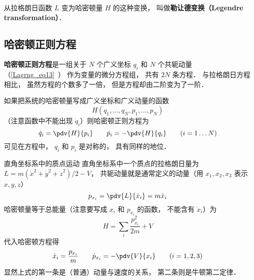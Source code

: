 从拉格朗日函数 $L$ 变为哈密顿量 $H$ 的这种变换， 叫做\textbf{勒让德变换（Legendre transformation）}．

\subsection{哈密顿正则方程}
\textbf{哈密顿正则方程}是一组关于 $N$ 个广义坐标 $q_i$ 和 $N$ 个共轭动量（\autoref{Lagrng_eq13}~） 作为变量的微分方程组， 共有 $2N$ 条方程． 与拉格朗日方程相比， 虽然方程的个数多了一倍， 但是方程却由二阶变为了一阶．

如果把系统的哈密顿量写成广义坐标和广义动量的函数
\begin{equation}
H(q_1,\dots, q_N, p_1,\dots, p_N)
\end{equation}
（注意函数中不能出现 $\dot q_i$）则哈密顿正则方程为
\begin{equation}\label{HamCan_eq2}
\dot q_i = \pdv{H}{p_i}
\qquad
\dot p_i = -\pdv{H}{q_i}
\qquad
(i = 1\dots N)
\end{equation}
可见在方程中， $q_i$ 和 $p_i$ 是对称的， 具有同样的地位．

\begin{example}{直角坐标系中的质点运动}
直角坐标系中一个质点的拉格朗日量为 $L = m(\dot x^2 + \dot y^2 + \dot z^2)/2 - V$， 共轭动量就是通常定义的动量（用 $x_1,x_2,x_3$ 表示 $x, y, z$）
\begin{equation}
p_{x_i} = \pdv{L}{\dot x_i} = m\dot x_i
\end{equation}
哈密顿量等于总能量（注意要写成 $x_i$ 和 $p_{x_i}$ 的函数， 不能含有 $\dot x_i$）为
\begin{equation}
H = \sum_i \frac{p_{x_i}^2}{2m} + V
\end{equation}
代入哈密顿方程得
\begin{equation}
\dot x_i = \frac{p_{x_i}}{m}
\qquad
\dot p_{x_i} = -\pdv{V}{x_i}
\qquad (i = 1,2,3)
\end{equation}
显然上式的第一条是（普通）动量与速度的关系， 第二条则是牛顿第二定律．
\end{example}


